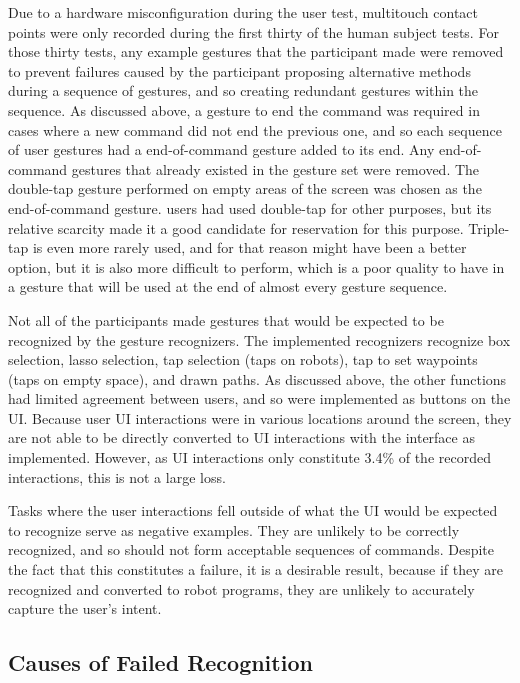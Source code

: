 Due to a hardware misconfiguration during the user test, multitouch contact points were only recorded during the first thirty of the human subject tests. 
For those thirty tests, any example gestures that the participant made were removed to prevent failures caused by the participant proposing alternative methods during a sequence of gestures, and so creating redundant gestures within the sequence. 
As discussed above, a gesture to end the command was required in cases where a new command did not end the previous one, and so each sequence of user gestures had a end-of-command gesture added to its end. 
Any end-of-command gestures that already existed in the gesture set were removed. 
The double-tap gesture performed on empty areas of the screen was chosen as the end-of-command gesture. 
 users had used double-tap for other purposes, but its relative scarcity made it a good candidate for reservation for this purpose. 
Triple-tap is even more rarely used, and for that reason might have been a better option, but it is also more difficult to perform, which is a poor quality to have in a gesture that will be used at the end of almost every gesture sequence. 

Not all of the participants made gestures that would be expected to be recognized by the gesture recognizers. 
The implemented recognizers recognize box selection, lasso selection, tap selection (taps on robots), tap to set waypoints (taps on empty space), and drawn paths. 
As discussed above, the other functions had limited agreement between users, and so were implemented as buttons on the UI. 
Because user UI interactions were in various locations around the screen, they are not able to be directly converted to UI interactions with the interface as implemented. 
However, as UI interactions only constitute 3.4\% of the recorded interactions, this is not a large loss. 

Tasks where the user interactions fell outside of what the UI would be expected to recognize serve as negative examples.
They are unlikely to be correctly recognized, and so should not form acceptable sequences of commands. 
Despite the fact that this constitutes a failure, it is a desirable result, because if they are recognized and converted to robot programs, they are unlikely to accurately capture the user's intent. 

\subsection{Causes of Failed Recognition}

